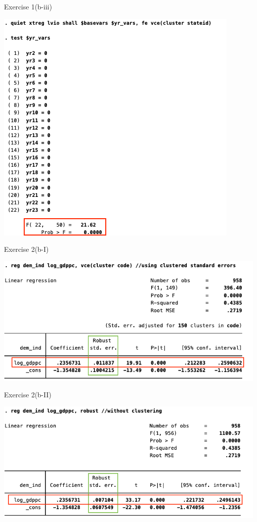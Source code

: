 \documentclass[
  10pt,
  ignorenonframetext,
]{beamer}
\begin{document}
\begin{frame}{Exercise 1(b-iii)}
\protect\hypertarget{Ex1-TestTimeFEs}{}
\begin{flushleft}\includegraphics[width=0.7\linewidth]{pictures/Ex1-TestTimeFEs} \end{flushleft}
\end{frame}

\begin{frame}{Exercise 2(b-I)}
\protect\hypertarget{Ex2-pooledsimplewithclustering}{}
\begin{flushleft}\includegraphics[width=0.9\linewidth]{pictures/Ex2-pooledsimplewithclustering} \end{flushleft}
\end{frame}

\begin{frame}{Exercise 2(b-II)}
\protect\hypertarget{Ex2-pooledsimplemoclustering}{}
\begin{flushleft}\includegraphics[width=0.9\linewidth]{pictures/Ex2-pooledsimplemoclustering} \end{flushleft}
\end{frame}
\end{document}
